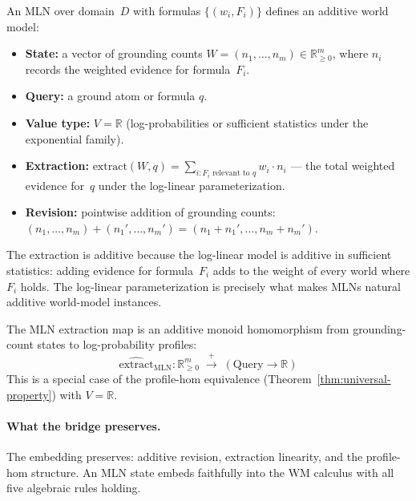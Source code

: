 \begin{definition}
\label{def:mln-wm}
An MLN over domain~$D$ with formulas $\{(w_i, F_i)\}$ defines an
additive world model:
\begin{itemize}
\item \textbf{State:} a vector of grounding counts
  $W = (n_1, \ldots, n_m) \in \mathbb{R}_{\ge 0}^m$, where $n_i$
  records the weighted evidence for formula~$F_i$.
\item \textbf{Query:} a ground atom or formula $q$.
\item \textbf{Value type:} $V = \mathbb{R}$ (log-probabilities or
  sufficient statistics under the exponential family).
\item \textbf{Extraction:} $\mathrm{extract}(W, q) = \sum_{i : F_i
  \text{ relevant to } q} w_i \cdot n_i$ --- the total weighted
  evidence for~$q$ under the log-linear parameterization.
\item \textbf{Revision:} pointwise addition of grounding counts:
  $(n_1, \ldots, n_m) + (n_1', \ldots, n_m') =
  (n_1 + n_1', \ldots, n_m + n_m')$.
\end{itemize}
\end{definition}

\noindent
The extraction is additive because the log-linear model is additive in
sufficient statistics: adding evidence for formula~$F_i$ adds to the
weight of every world where $F_i$ holds.  The log-linear
parameterization is precisely what makes MLNs natural additive
world-model instances.

\begin{theorem}
\label{thm:mln-hom}
The MLN extraction map is an additive monoid homomorphism from
grounding-count states to log-probability profiles:
\[
  \widehat{\mathrm{extract}}_{\mathrm{MLN}} :
  \mathbb{R}_{\ge 0}^m \;\xrightarrow{\;+\;}\;
  (\mathrm{Query} \to \mathbb{R})
\]
This is a special case of the profile-hom equivalence
(Theorem~\ref{thm:universal-property}) with $V = \mathbb{R}$.
\end{theorem}

\paragraph{What the bridge preserves.}
The embedding preserves: additive revision, extraction linearity, and
the profile-hom structure.  An MLN state embeds faithfully into the
WM calculus with all five algebraic rules holding.

